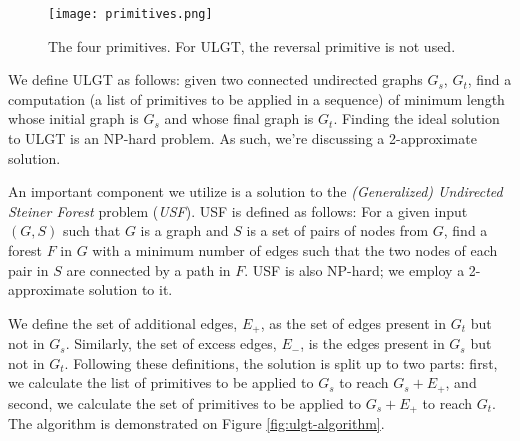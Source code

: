\documentclass{article}
\begin{document}
\begin{figure}
  \centering
  \texttt{[image: primitives.png]}
  \caption{The four primitives. For ULGT, the reversal primitive is not used.}
  \label{fig:primitives}
\end{figure}

We define ULGT as follows: given
two connected undirected graphs $G_s$, $G_t$, find a computation (a list of primitives to be applied in a sequence) of minimum length whose initial
graph is $G_s$ and whose final graph is $G_t$. Finding the ideal solution to ULGT is an NP-hard problem. As such, we're discussing a 2-approximate solution.

An important component we utilize is a solution to the \textit{(Generalized) Undirected Steiner Forest} problem (\textit{USF}). USF is defined as follows: For a given input $(G, S)$ such that $G$ is a graph and $S$ is a set of pairs of nodes from $G$, find a forest $F$ in $G$ with a minimum number of edges such that the two nodes of each pair in $S$ are connected by a path in $F$. USF is also NP-hard; we employ a 2-approximate solution to it.

We define the set of additional edges, $E_+$, as the set of edges present in $G_t$ but not in $G_s$. Similarly, the set of excess edges, $E_-$, is the edges present in $G_s$ but not in $G_t$. Following these definitions, the solution is split up to two parts: first, we calculate the list of primitives to be applied to $G_s$ to reach $G_s + E_+$, and second, we calculate the set of primitives to be applied to $G_s + E_+$ to reach $G_t$. The algorithm is demonstrated on Figure \ref{fig:ulgt-algorithm}.
\end{document}
